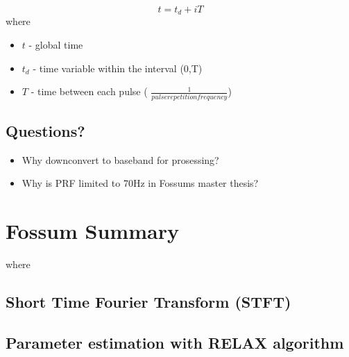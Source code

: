 \begin{equation}
    t = t_d + iT
\end{equation}
where
\begin{itemize}
    \item $t$ - global time
    \item $t_d$ - time variable within the interval (0,T)
    \item $T$ - time between each pulse ( $\frac{1}{pulse repetition frequency}$)
\end{itemize}



\section{Questions?}
\begin{itemize}
    \item Why downconvert to baseband for prosessing?
    \item Why is PRF limited to 70Hz in Fossums master thesis?
    
\end{itemize}

\chapter{Fossum Summary}

where
\section{Short Time Fourier Transform (STFT)}

\section{Parameter estimation with RELAX algorithm}


